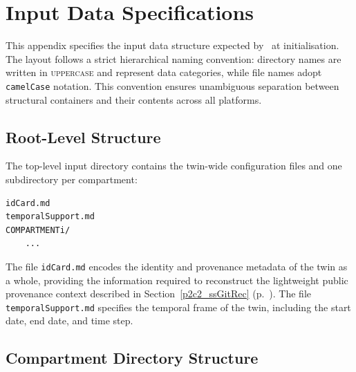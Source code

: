 \chapter*{Input Data Specifications}
{}
\fancyhead[LE]{\thepage} 
\fancyhead[RO]{\thepage} 
\fancyfoot[C]{\thepage}

\renewcommand{\headrulewidth}{0.1pt}

\setlength{\parindent}{0cm}
\setlength{\parskip}{9pt}
\vspace{-1cm}

\htastarget



This appendix specifies the input data structure expected by \hydrot\ at initialisation. The layout follows a strict hierarchical naming convention: directory names are written in \textsc{uppercase} and represent data categories, while file names adopt \texttt{camelCase} notation. This convention ensures unambiguous separation between structural containers and their contents across all platforms.


\section*{Root-Level Structure}

The top-level input directory contains the twin-wide configuration files and one subdirectory per compartment:

\begin{verbatim}
idCard.md
temporalSupport.md
COMPARTMENTi/
    ...
\end{verbatim}

The file \texttt{idCard.md} encodes the identity and provenance metadata of the twin as a whole, providing the information required to reconstruct the lightweight public provenance context described in Section~\ref{p2c2_ssGitRec} (p.~\pageref{p2c2_ssGitRec}). The file \texttt{temporalSupport.md} specifies the temporal frame of the twin, including the start date, end date, and time step.


\section*{Compartment Directory Structure}

